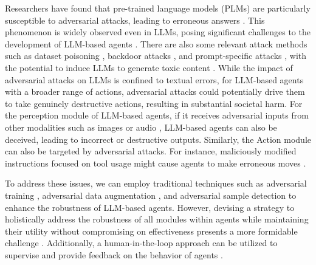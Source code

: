 Researchers have found that pre-trained language models (PLMs) are particularly susceptible to adversarial attacks, leading to erroneous answers \cite{DBLP:conf/aaai/JinJZS20,DBLP:conf/ndss/LiJDLW19,DBLP:conf/acl/RenDHC19}. 
This phenomenon is widely observed even in LLMs, posing significant challenges to the development of LLM-based agents \cite{DBLP:journals/corr/abs-2306-04528,DBLP:journals/corr/abs-2303-00293}. 
There are also some relevant attack methods such as dataset poisoning \cite{DBLP:journals/corr/abs-1708-06733}, backdoor attacks \cite{DBLP:conf/acsac/Chen0C0MSW021,DBLP:conf/emnlp/LiMDS21}, and prompt-specific attacks \cite{DBLP:conf/nlpcc/ShiLYHZL22,DBLP:journals/corr/abs-2211-09527}, with the potential to induce LLMs to generate toxic content \cite{DBLP:journals/corr/abs-2211-09110,DBLP:conf/emnlp/GururanganCDGWW22,DBLP:journals/corr/abs-2306-05499}. 
While the impact of adversarial attacks on LLMs is confined to textual errors, for LLM-based agents with a broader range of actions, adversarial attacks could potentially drive them to take genuinely destructive actions, resulting in substantial societal harm.
For the perception module of LLM-based agents, if it receives adversarial inputs from other modalities such as images \cite{DBLP:journals/corr/abs-2108-00401} or audio \cite{DBLP:conf/sp/Carlini018}, LLM-based agents can also be deceived, leading to incorrect or destructive outputs. 
Similarly, the Action module can also be targeted by adversarial attacks. For instance, maliciously modified instructions focused on tool usage might cause agents to make erroneous moves \cite{DBLP:journals/corr/abs-2304-08354}.

To address these issues, we can employ traditional techniques such as adversarial training \cite{DBLP:conf/iclr/MadryMSTV18,DBLP:conf/iclr/ZhuCGSGL20}, adversarial data augmentation \cite{DBLP:conf/emnlp/MorrisLYGJQ20,DBLP:conf/acl/SiZQLWLS21}, and adversarial sample detection \cite{DBLP:conf/acl/YooKJK22,DBLP:conf/acl/LeP020} to enhance the robustness of LLM-based agents. 
However, devising a strategy to holistically address the robustness of all modules within agents while maintaining their utility without compromising on effectiveness presents a more formidable challenge \cite{DBLP:conf/iclr/TsiprasSETM19,DBLP:conf/icml/ZhangYJXGJ19}. Additionally, a human-in-the-loop approach can be utilized to supervise and provide feedback on the behavior of agents \cite{DBLP:journals/corr/abs-2103-14659, DBLP:journals/corr/abs-2204-03685, DBLP:journals/corr/abs-2306-07932}.





